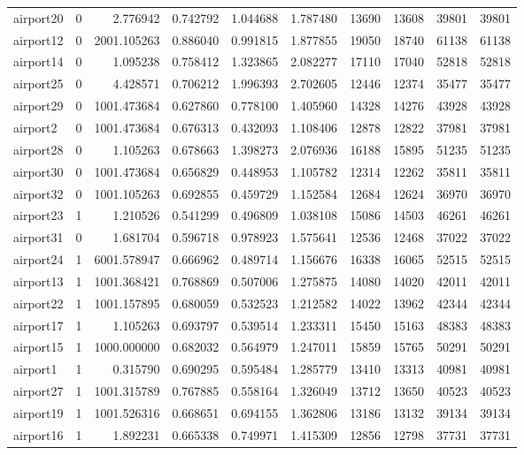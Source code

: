 \begin{longtable}{|l|r|r|r|r|r|r|r|r|r|}
airport20 & 0 & 2.776942 & 0.742792 & 1.044688 & 1.787480 & 13690 & 13608 & 39801 & 39801 \\
airport12 & 0 & 2001.105263 & 0.886040 & 0.991815 & 1.877855 & 19050 & 18740 & 61138 & 61138 \\
airport14 & 0 & 1.095238 & 0.758412 & 1.323865 & 2.082277 & 17110 & 17040 & 52818 & 52818 \\
airport25 & 0 & 4.428571 & 0.706212 & 1.996393 & 2.702605 & 12446 & 12374 & 35477 & 35477 \\
airport29 & 0 & 1001.473684 & 0.627860 & 0.778100 & 1.405960 & 14328 & 14276 & 43928 & 43928 \\
airport2 & 0 & 1001.473684 & 0.676313 & 0.432093 & 1.108406 & 12878 & 12822 & 37981 & 37981 \\
airport28 & 0 & 1.105263 & 0.678663 & 1.398273 & 2.076936 & 16188 & 15895 & 51235 & 51235 \\
airport30 & 0 & 1001.473684 & 0.656829 & 0.448953 & 1.105782 & 12314 & 12262 & 35811 & 35811 \\
airport32 & 0 & 1001.105263 & 0.692855 & 0.459729 & 1.152584 & 12684 & 12624 & 36970 & 36970 \\
airport23 & 1 & 1.210526 & 0.541299 & 0.496809 & 1.038108 & 15086 & 14503 & 46261 & 46261 \\
airport31 & 0 & 1.681704 & 0.596718 & 0.978923 & 1.575641 & 12536 & 12468 & 37022 & 37022 \\
airport24 & 1 & 6001.578947 & 0.666962 & 0.489714 & 1.156676 & 16338 & 16065 & 52515 & 52515 \\
airport13 & 1 & 1001.368421 & 0.768869 & 0.507006 & 1.275875 & 14080 & 14020 & 42011 & 42011 \\
airport22 & 1 & 1001.157895 & 0.680059 & 0.532523 & 1.212582 & 14022 & 13962 & 42344 & 42344 \\
airport17 & 1 & 1.105263 & 0.693797 & 0.539514 & 1.233311 & 15450 & 15163 & 48383 & 48383 \\
airport15 & 1 & 1000.000000 & 0.682032 & 0.564979 & 1.247011 & 15859 & 15765 & 50291 & 50291 \\
airport1 & 1 & 0.315790 & 0.690295 & 0.595484 & 1.285779 & 13410 & 13313 & 40981 & 40981 \\
airport27 & 1 & 1001.315789 & 0.767885 & 0.558164 & 1.326049 & 13712 & 13650 & 40523 & 40523 \\
airport19 & 1 & 1001.526316 & 0.668651 & 0.694155 & 1.362806 & 13186 & 13132 & 39134 & 39134 \\
airport16 & 1 & 1.892231 & 0.665338 & 0.749971 & 1.415309 & 12856 & 12798 & 37731 & 37731 \\

\end{longtable}
